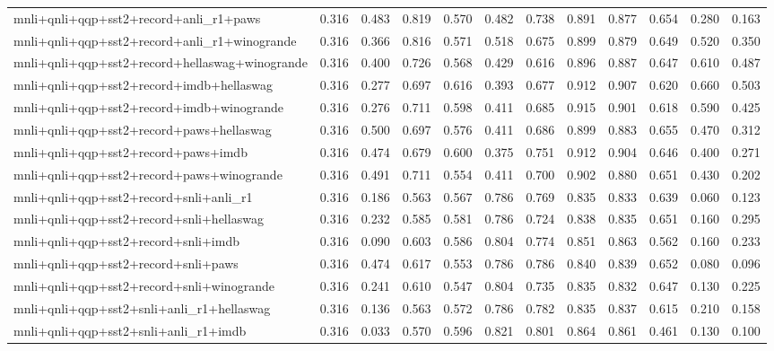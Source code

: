 \begin{table}[t]
\begin{tabular}{lrrrrrrrrrrr}
    mnli+qnli+qqp+sst2+record+anli\_r1+paws & 0.316 & 0.483 & 0.819 & 0.570 & 0.482 & 0.738 & 0.891 & 0.877 & 0.654 & 0.280 & 0.163 \\
    mnli+qnli+qqp+sst2+record+anli\_r1+winogrande & 0.316 & 0.366 & 0.816 & 0.571 & 0.518 & 0.675 & 0.899 & 0.879 & 0.649 & 0.520 & 0.350 \\
    mnli+qnli+qqp+sst2+record+hellaswag+winogrande & 0.316 & 0.400 & 0.726 & 0.568 & 0.429 & 0.616 & 0.896 & 0.887 & 0.647 & 0.610 & 0.487 \\
    mnli+qnli+qqp+sst2+record+imdb+hellaswag & 0.316 & 0.277 & 0.697 & 0.616 & 0.393 & 0.677 & 0.912 & 0.907 & 0.620 & 0.660 & 0.503 \\
    mnli+qnli+qqp+sst2+record+imdb+winogrande & 0.316 & 0.276 & 0.711 & 0.598 & 0.411 & 0.685 & 0.915 & 0.901 & 0.618 & 0.590 & 0.425 \\
    mnli+qnli+qqp+sst2+record+paws+hellaswag & 0.316 & 0.500 & 0.697 & 0.576 & 0.411 & 0.686 & 0.899 & 0.883 & 0.655 & 0.470 & 0.312 \\
    mnli+qnli+qqp+sst2+record+paws+imdb & 0.316 & 0.474 & 0.679 & 0.600 & 0.375 & 0.751 & 0.912 & 0.904 & 0.646 & 0.400 & 0.271 \\
    mnli+qnli+qqp+sst2+record+paws+winogrande & 0.316 & 0.491 & 0.711 & 0.554 & 0.411 & 0.700 & 0.902 & 0.880 & 0.651 & 0.430 & 0.202 \\
    mnli+qnli+qqp+sst2+record+snli+anli\_r1 & 0.316 & 0.186 & 0.563 & 0.567 & 0.786 & 0.769 & 0.835 & 0.833 & 0.639 & 0.060 & 0.123 \\
    mnli+qnli+qqp+sst2+record+snli+hellaswag & 0.316 & 0.232 & 0.585 & 0.581 & 0.786 & 0.724 & 0.838 & 0.835 & 0.651 & 0.160 & 0.295 \\
    mnli+qnli+qqp+sst2+record+snli+imdb & 0.316 & 0.090 & 0.603 & 0.586 & 0.804 & 0.774 & 0.851 & 0.863 & 0.562 & 0.160 & 0.233 \\
    mnli+qnli+qqp+sst2+record+snli+paws & 0.316 & 0.474 & 0.617 & 0.553 & 0.786 & 0.786 & 0.840 & 0.839 & 0.652 & 0.080 & 0.096 \\
    mnli+qnli+qqp+sst2+record+snli+winogrande & 0.316 & 0.241 & 0.610 & 0.547 & 0.804 & 0.735 & 0.835 & 0.832 & 0.647 & 0.130 & 0.225 \\
    mnli+qnli+qqp+sst2+snli+anli\_r1+hellaswag & 0.316 & 0.136 & 0.563 & 0.572 & 0.786 & 0.782 & 0.835 & 0.837 & 0.615 & 0.210 & 0.158 \\
    mnli+qnli+qqp+sst2+snli+anli\_r1+imdb & 0.316 & 0.033 & 0.570 & 0.596 & 0.821 & 0.801 & 0.864 & 0.861 & 0.461 & 0.130 & 0.100 \\

\end{tabular}
\end{table}
